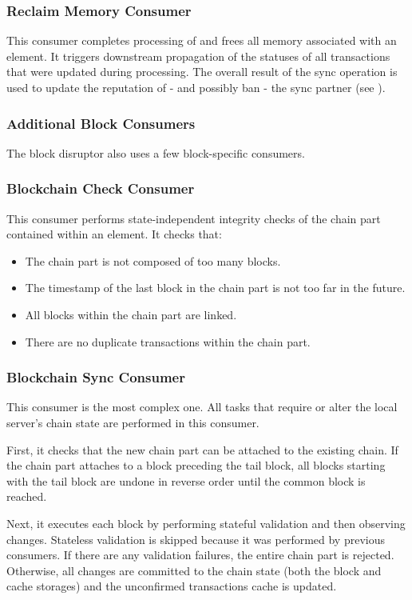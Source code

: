 \subsubsection*{Reclaim Memory Consumer}
This consumer completes processing of and frees all memory associated with an element.
It triggers downstream propagation of the statuses of all transactions that were updated during processing.
The overall result of the sync operation is used to update the reputation of - and possibly ban - the sync partner (see ).

\subsubsection{Additional Block Consumers}
The block disruptor also uses a few block-specific consumers.

\subsubsection*{Blockchain Check Consumer}
This consumer performs state-independent integrity checks of the chain part contained within an element.
It checks that:
\begin{itemize}
	\item The chain part is not composed of too many blocks.
	\item The timestamp of the last block in the chain part is not too far in the future.
	\item All blocks within the chain part are linked.
	\item There are no duplicate transactions within the chain part.
\end{itemize}

\subsubsection*{Blockchain Sync Consumer}
This consumer is the most complex one.
All tasks that require or alter the local server's chain state are performed in this consumer.

First, it checks that the new chain part can be attached to the existing chain.
If the chain part attaches to a block preceding the tail block, all blocks starting with the tail block are undone in reverse order until the common block is reached.

Next, it executes each block by performing stateful validation and then observing changes.
Stateless validation is skipped because it was performed by previous consumers.
If there are any validation failures, the entire chain part is rejected.
Otherwise, all changes are committed to the chain state (both the block and cache storages) and the unconfirmed transactions cache is updated.

